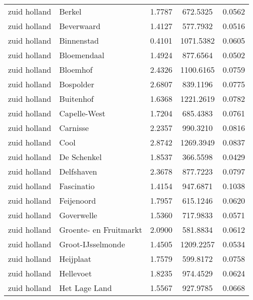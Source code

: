 \begin{longtable}{llccc}
	zuid holland  & Berkel                           & 1.7787  & 672.5325  & 0.0562          \\
	zuid holland  & Beverwaard                       & 1.4127  & 577.7932  & 0.0516          \\
	zuid holland  & Binnenstad                       & 0.4101  & 1071.5382 & 0.0605          \\
	zuid holland  & Bloemendaal                      & 1.4924  & 877.6564  & 0.0502          \\
	zuid holland  & Bloemhof                         & 2.4326  & 1100.6165 & 0.0759          \\
	zuid holland  & Bospolder                        & 2.6807  & 839.1196  & 0.0775          \\
	zuid holland  & Buitenhof                        & 1.6368  & 1221.2619 & 0.0782          \\
	zuid holland  & Capelle-West                     & 1.7204  & 685.4383  & 0.0761          \\
	zuid holland  & Carnisse                         & 2.2357  & 990.3210  & 0.0816          \\
	zuid holland  & Cool                             & 2.8742  & 1269.3949 & 0.0837          \\
	zuid holland  & De Schenkel                      & 1.8537  & 366.5598  & 0.0429          \\
	zuid holland  & Delfshaven                       & 2.3678  & 877.7223  & 0.0797          \\
	zuid holland  & Fascinatio                       & 1.4154  & 947.6871  & 0.1038          \\
	zuid holland  & Feijenoord                       & 1.7957  & 615.1246  & 0.0620          \\
	zuid holland  & Goverwelle                       & 1.5360  & 717.9833  & 0.0571          \\
	zuid holland  & Groente- en Fruitmarkt           & 2.0900  & 581.8834  & 0.0612          \\
	zuid holland  & Groot-IJsselmonde                & 1.4505  & 1209.2257 & 0.0534          \\
	zuid holland  & Heijplaat                        & 1.7579  & 599.8172  & 0.0758          \\
	zuid holland  & Hellevoet                        & 1.8235  & 974.4529  & 0.0624          \\
	zuid holland  & Het Lage Land                    & 1.5567  & 927.9785  & 0.0668          \\

\end{longtable}
